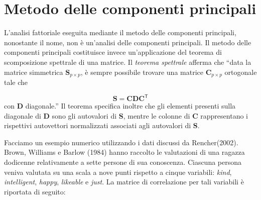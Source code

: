 \documentclass[
  11pt,
]{krantz}
\theoremstyle{definition}
\theoremstyle{definition}
\theoremstyle{definition}
\theoremstyle{definition}
\theoremstyle{remark}
\begin{document}
\hypertarget{metodo-delle-componenti-principali}{%
\section{Metodo delle componenti principali}\label{metodo-delle-componenti-principali}}

L'analisi fattoriale eseguita mediante il metodo delle componenti principali, nonostante il nome, non è un'analisi delle componenti principali. Il metodo delle componenti principali costituisce invece un'applicazione del teorema di scomposizione spettrale di una matrice. Il \emph{teorema spettrale} afferma che ``data la matrice simmetrica \(\textbf{S}_{p \times p}\), è sempre possibile trovare una matrice \(\textbf{C}_{p \times p}\) ortogonale tale che

\[
\textbf{S} = \textbf{C}\textbf{D}\textbf{C}^{\mathsf{T}}
\] con \textbf{D} diagonale.'' Il teorema specifica inoltre che gli elementi presenti sulla diagonale di \textbf{D} sono gli autovalori di \textbf{S}, mentre le colonne di \textbf{C} rappresentano i rispettivi autovettori normalizzati associati agli autovalori di \textbf{S}.

Facciamo un esempio numerico utilizzando i dati discussi da Rencher(2002). Brown, Williams e Barlow (1984) hanno raccolto le valutazioni di una ragazza dodicenne relativamente a sette persone di sua conoscenza. Ciascuna persona veniva valutata su una scala a nove punti rispetto a cinque variabili: \emph{kind}, \emph{intelligent}, \emph{happy}, \emph{likeable} e \emph{just}. La matrice di correlazione per tali variabili è riportata di seguito:
\end{document}
